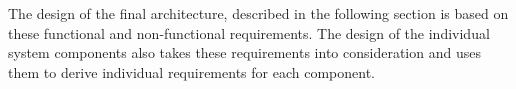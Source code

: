 The design of the final architecture, described in the following section is based on these functional and non-functional requirements. The design of the individual system components also takes these requirements into consideration and uses them to derive individual requirements for each component.


 






